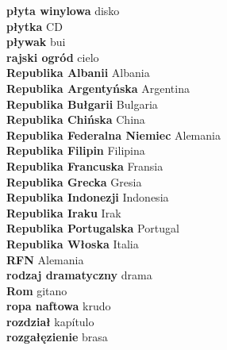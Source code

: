 \textbf{ płyta winylowa  } disko \\
\textbf{ płytka  } CD \\
\textbf{ pływak  } bui \\
\textbf{ rajski ogród  } cielo \\
\textbf{ Republika Albanii  } Albania \\
\textbf{ Republika Argentyńska  } Argentina \\
\textbf{ Republika Bułgarii  } Bulgaria \\
\textbf{ Republika Chińska  } China \\
\textbf{ Republika Federalna Niemiec  } Alemania \\
\textbf{ Republika Filipin  } Filipina \\
\textbf{ Republika Francuska  } Fransia \\
\textbf{ Republika Grecka  } Gresia \\
\textbf{ Republika Indonezji  } Indonesia \\
\textbf{ Republika Iraku  } Irak \\
\textbf{ Republika Portugalska  } Portugal \\
\textbf{ Republika Włoska  } Italia \\
\textbf{ RFN  } Alemania \\
\textbf{ rodzaj dramatyczny  } drama \\
\textbf{ Rom  } gitano \\
\textbf{ ropa naftowa  } krudo \\
\textbf{ rozdział  } kapítulo \\
\textbf{ rozgałęzienie  } brasa \\
